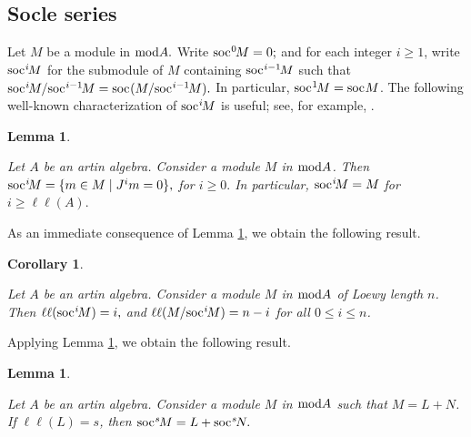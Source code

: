 \documentclass[10pt]{amsart}
\newtheorem{Cor}[Theo]{Corollary}
\newtheorem{Lemma}[Theo]{Lemma}
\theoremstyle{definition}
\newcommand{\mmod}{{\rm mod}}
\newcommand{\soc}{{\rm soc}\hspace{.5pt}}
\begin{document}
\subsection{\sc Socle series} Let $M$ be a module in $\mmod A.$ Write $\soc^0\hspace{-1.2pt} M=0;$ and for each integer $i\ge 1$, write $\soc^i\hspace{-1.2pt}M$ for the submodule of $M$ containing $\soc^{i-1}\hspace{-1.2pt}M$ such that $\soc^i\hspace{-1.2pt}M/\soc^{i-1}\hspace{-1.2pt}M=\soc(M/\soc^{i-1}\hspace{-1.2pt}M).$ In particular, $\soc^1\hspace{-1.2pt}M=\soc M$. The following well-known characterization of $\soc^i\hspace{-1.2pt}M$ is useful; see, for example, \cite[p.346]{AnF}.

\begin{Lemma}\label{isoc_char}

Let $A$ be an artin algebra. Consider a module $M$ in $\mmod A$. Then
$\soc^i\hspace{-1.5pt}M=\{m\in M \mid J^im=0\},$ for $i\ge 0.$ In particular, $\soc^i\hspace{-1.5pt}M=M$ for $i\ge \ell\ell(A).$
    
\end{Lemma}

\smallskip

As an immediate consequence of Lemma \ref{isoc_char}, we obtain the following result.

\begin{Cor}\label{soci_LL}

Let $A$ be an artin algebra. Consider a module $M$ in $\mmod A$ of Loewy length $n$. Then $\ell\ell(\soc^i\hspace{-1.2pt}M)=i,$ and $\ell\ell(M/\soc^i\hspace{-1.2pt}M)=n-i$ for all $0\le i\le n$.

\end{Cor}

\smallskip

Applying Lemma \ref{isoc_char}, we obtain the following result. 

\begin{Lemma}\label{socs_sum}

Let $A$ be an artin algebra. Consider a module $M$ in $\mmod A$ such that $M=L+N$. If $\ell\ell(L)=s$, then $\soc^s\hspace{-1.2pt}M=L+\soc^s\hspace{-1.2pt}N.$

\end{Lemma}
\end{document}
